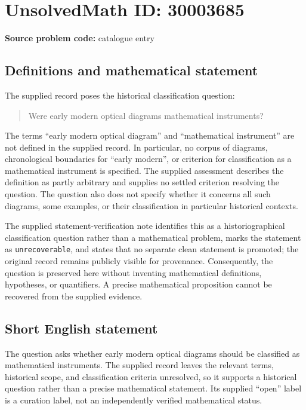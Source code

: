 \documentclass[11pt]{article}
\begin{document}
\section*{UnsolvedMath ID: 30003685}
\textbf{Source problem code:} catalogue entry
\subsection{Definitions and mathematical statement}
The supplied record poses the historical classification question:
\begin{quote}
Were early modern optical diagrams mathematical instruments?
\end{quote}
The terms ``early modern optical diagram'' and ``mathematical instrument'' are not defined in the supplied record. In particular, no corpus of diagrams, chronological boundaries for ``early modern'', or criterion for classification as a mathematical instrument is specified. The supplied assessment describes the definition as partly arbitrary and supplies no settled criterion resolving the question. The question also does not specify whether it concerns all such diagrams, some examples, or their classification in particular historical contexts.

The supplied statement-verification note identifies this as a historiographical classification question rather than a mathematical problem, marks the statement as \texttt{unrecoverable}, and states that no separate clean statement is promoted; the original record remains publicly visible for provenance. Consequently, the question is preserved here without inventing mathematical definitions, hypotheses, or quantifiers. A precise mathematical proposition cannot be recovered from the supplied evidence.
\subsection{Short English statement}
The question asks whether early modern optical diagrams should be classified as mathematical instruments. The supplied record leaves the relevant terms, historical scope, and classification criteria unresolved, so it supports a historical question rather than a precise mathematical statement. Its supplied ``open'' label is a curation label, not an independently verified mathematical status.
\end{document}
